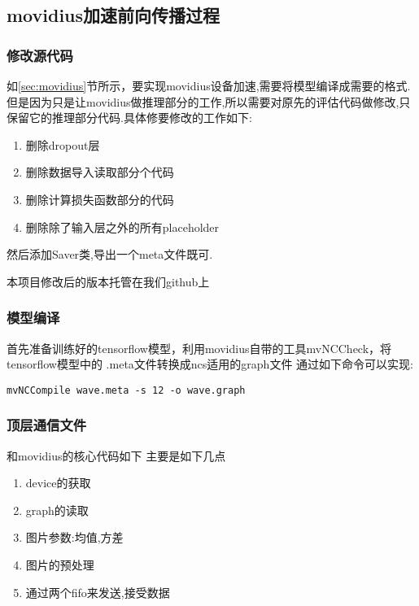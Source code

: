 \subsection{movidius加速前向传播过程}
\subsubsection{修改源代码}

如\ref{sec:movidius}节所示，要实现movidius设备加速,需要将模型编译成需要的格式.
但是因为只是让movidius做推理部分的工作,所以需要对原先的评估代码做修改,只保留它的推理部分代码.具体修要修改的工作如下:
\begin{enumerate}
	\item 删除dropout层
	\item 删除数据导入读取部分个代码
	 \item	删除计算损失函数部分的代码
	 \item	删除除了输入层之外的所有placeholder
\end{enumerate}
然后添加Saver类,导出一个meta文件既可.

本项目修改后的版本托管在我们github\cite{my-nerual-style-tensorflow}上
\subsubsection{模型编译}
首先准备训练好的tensorflow模型，利用movidius自带的工具mvNCCheck，将tensorflow模型中的 .meta文件转换成ncs适用的graph文件
通过如下命令可以实现:
\begin{lstlisting}
mvNCCompile wave.meta -s 12 -o wave.graph
\end{lstlisting}
\subsubsection{顶层通信文件}
和movidius的核心代码如下
主要是如下几点
\begin{enumerate}
  \item device的获取
  \item graph的读取
  \item	图片参数:均值,方差
  \item	图片的预处理
  \item	通过两个fifo来发送,接受数据
\end{enumerate}
